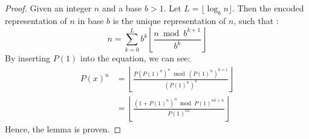 \documentclass{article}
\theoremstyle{plain}
\theoremstyle{definition}
\begin{document}
\begin{proof}
    Given an integer $n$ and a base $b > 1$. Let $L = \lfloor \log_b{n} \rfloor$. Then the encoded representation of $n$ in base $b$ is the unique representation of $n$, such that \cite{cormen2009introduction}:
    \begin{equation}
        n = \sum_{k=0}^{L} b^{k} \left\lfloor\frac{n \bmod b^{k+1}}{b^{k}}\right\rfloor 
    \end{equation}
    By inserting $P(1)$ into the equation, we can see:
    \begin{align}
        [x^k] P(x)^{n} &= \left\lfloor\frac{P(P(1)^{n})^{n} \bmod (P(1)^{n})^{k+1}}{(P(1)^{n})^{k}}\right\rfloor \\
        &= \left\lfloor\frac{(1 + P(1)^{n})^{n} \bmod P(1)^{n k + n}}{P(1)^{n k}}\right\rfloor
    \end{align}
    Hence, the lemma is proven.
\end{proof}
\end{document}

